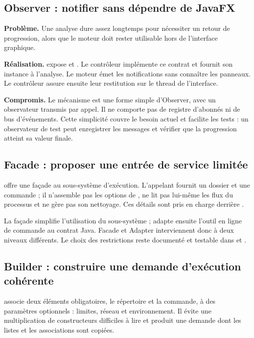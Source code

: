 \clearpage
{}
\subsection{Observer : notifier sans dépendre de JavaFX}
\textbf{Problème.} Une analyse dure assez longtemps pour nécessiter un retour de progression, alors que le moteur doit rester utilisable hors de l'interface graphique.

\textbf{Réalisation.}  expose  et . Le contrôleur implémente ce contrat et fournit son instance à l'analyse. Le moteur émet les notifications sans connaître les panneaux. Le contrôleur assure ensuite leur restitution sur le thread de l'interface.

\textbf{Compromis.} Le mécanisme est une forme simple d'Observer, avec un observateur transmis par appel. Il ne comporte pas de registre d'abonnés ni de bus d'événements. Cette simplicité couvre le besoin actuel et facilite les tests : un observateur de test peut enregistrer les messages et vérifier que la progression atteint sa valeur finale.

\subsection{Facade : proposer une entrée de service limitée}
 offre une façade au sous-système d'exécution. L'appelant fournit un dossier et une commande ; il n'assemble pas les options de , ne lit pas lui-même les flux du processus et ne gère pas son nettoyage. Ces détails sont pris en charge derrière .

La façade simplifie l'utilisation du sous-système ;  adapte ensuite l'outil en ligne de commande au contrat Java. Facade et Adapter interviennent donc à deux niveaux différents. Le choix des restrictions reste documenté et testable dans  et .

\subsection{Builder : construire une demande d'exécution cohérente}
 associe deux éléments obligatoires, le répertoire et la commande, à des paramètres optionnels : limites, réseau et environnement. Il évite une multiplication de constructeurs difficiles à lire et produit une demande dont les listes et les associations sont copiées.

